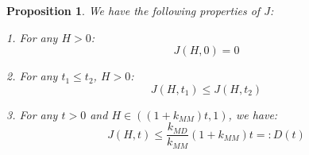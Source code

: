 \documentclass[notitlepage,reqno,11pt]{amsart}
\numberwithin{equation}{section}
\newtheorem{prop}{Proposition}[section]
\begin{document}
\begin{prop}
    We have the following properties of $J$:

    1. For any $H>0$:
    \begin{equation}
        J(H,0) = 0
    \end{equation}

    2. For any $t_1 \leq t_2$, $H>0$:
    \begin{equation}
        J(H,t_1) \leq J(H,t_2)
    \end{equation}
    

    3. For any $t>0$ and $H\in((1+k_{MM}) t,1)$, we have:
    \begin{equation}\label{8.5}
        J(H,t) \leq \frac{k_{MD}}{k_{MM}}(1 + k_{MM}) t =: D(t)
    \end{equation}

\end{prop}
\end{document}
